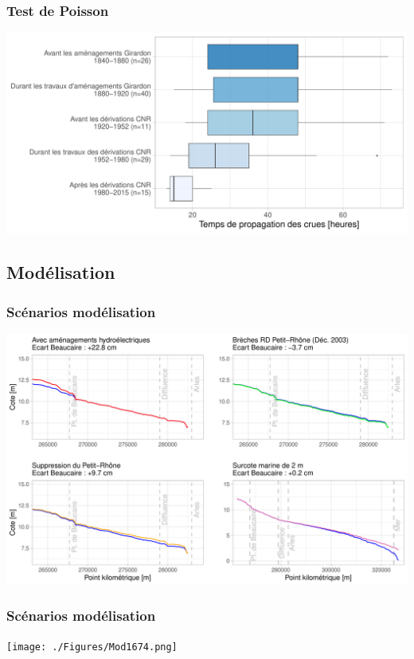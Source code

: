 \documentclass[compress,9pt]{beamer}
\begin{document}
	\begin{frame}
    		\frametitle{Test de Poisson}
    		\centering
    		\includegraphics[width = .9\textwidth]{./Figures/Tprop.pdf} 	
    	\end{frame}
	
	\subsection{Modélisation}
	 \begin{frame}
    		\frametitle{Scénarios modélisation}
    		\centering
    		\includegraphics[width = .9\textwidth]{./Figures/Mod4cases.pdf} 	
    	\end{frame}
    	
    	\begin{frame}
    		\frametitle{Scénarios modélisation}
    		\centering
    		\texttt{[image: ./Figures/Mod1674.png]} 	
    	\end{frame}
	
	
\end{document}

